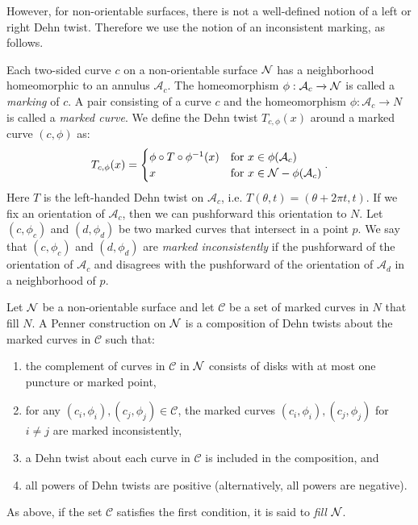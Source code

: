  However, for non-orientable surfaces, there is not a well-defined notion of a left or right Dehn twist. Therefore we use the notion of an inconsistent marking, as follows.  
 
  Each two-sided curve $c$ on a non-orientable surface $\mathcal{N}$ has a neighborhood homeomorphic to an
annulus $\mathcal{A}_c$. The homeomorphism $\phi: \mathcal{A}_c \xrightarrow{} \mathcal{N}$ is called a \textit{marking} of $c$. A pair consisting of a curve $c$ and the homeomorphism $\phi:\mathcal{A}_c\xrightarrow{} N$ is called a {\it marked curve}.  We define the Dehn twist $T_{c,\phi}(x)$ around a marked curve $(c,\phi)$ as:
\begin{align*}
  T_{c,\phi}(x) =
  \begin{cases}
    \phi \circ T \circ \phi^{-1}(x) & \text{for } x \in \phi(\mathcal{A}_c) \\
    x & \text{for } x \in \mathcal{N} - \phi(\mathcal{A}_c)
  \end{cases}.
\end{align*}
Here $T$ is the left-handed Dehn twist on $\mathcal{A}_c$, i.e. $T(\theta,t) = (\theta + 2\pi t,t)$. If we fix an
orientation of $\mathcal{A}_c$, then we can pushforward this orientation to $N$. Let 
$(c,\phi_c)$ and $(d,\phi_d)$ be two marked curves that intersect in a point $p$.  We say that $(c,\phi_c)$ and $(d,\phi_d)$ are {\it marked inconsistently} if the
pushforward of the orientation of $\mathcal{A}_c$ and disagrees with the pushforward of the orientation of $\mathcal{A}_d$ in a neighborhood of $p$.

 Let $\mathcal{N}$ be a non-orientable surface and let $\mathcal{C}$ be a set of marked curves in $N$ that fill $N$.  A Penner construction on $\mathcal{N}$ is a composition of Dehn twists about the marked curves in $\mathcal{C}$ such that:
\begin{enumerate}
\item the complement of curves in $\mathcal{C}$ in $\mathcal{N}$ consists of disks with at most one puncture or marked point,
    \item for any $(c_i,\phi_i),(c_j,\phi_j)\in\mathcal{C}$, the marked curves $(c_i,\phi_i),(c_j,\phi_j)$ for $i\neq j$ are marked inconsistently,
    \item a Dehn twist about each curve in $\mathcal{C}$ is included in the composition, and
    \item all powers of Dehn twists are positive (alternatively, all powers are negative).
\end{enumerate}
As above, if the set $\mathcal{C}$ satisfies the first condition, it is said to {\it fill} $\mathcal{N}$.

